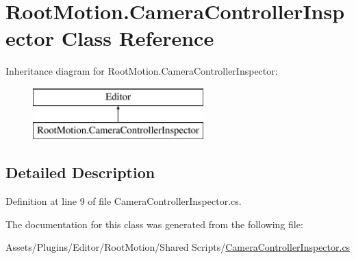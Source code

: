 \hypertarget{class_root_motion_1_1_camera_controller_inspector}{}\section{Root\+Motion.\+Camera\+Controller\+Inspector Class Reference}
\label{class_root_motion_1_1_camera_controller_inspector}
Inheritance diagram for Root\+Motion.\+Camera\+Controller\+Inspector\+:\begin{figure}[H]
\begin{center}
\leavevmode
\includegraphics[height=2.000000cm]{class_root_motion_1_1_camera_controller_inspector}
\end{center}
\end{figure}


\subsection{Detailed Description}


Definition at line 9 of file Camera\+Controller\+Inspector.\+cs.



The documentation for this class was generated from the following file\+:\begin{DoxyCompactItemize}
\item 
Assets/\+Plugins/\+Editor/\+Root\+Motion/\+Shared Scripts/\mbox{\hyperlink{_camera_controller_inspector_8cs}{Camera\+Controller\+Inspector.\+cs}}\end{DoxyCompactItemize}
